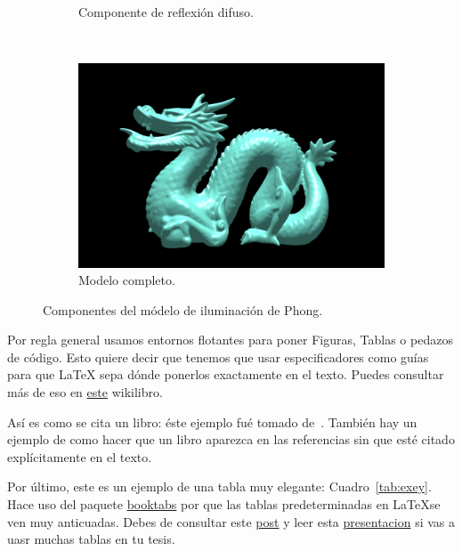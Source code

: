 \begin{figure}[htp]
\begin{subfigure}[b]{0.45\textwidth}
   \caption{Componente de reflexión difuso.}
   \label{fig:2c}
 \end{subfigure}
~
 \begin{subfigure}[b]{0.45\textwidth}
   \includegraphics[width=\textwidth]{img/cap02/completo}
   \caption{Modelo completo.}
   \label{fig:2d}
 \end{subfigure}
 \caption[Módelo de iluminación de Phong]{Componentes del módelo de iluminación de Phong.}
 \label{fig:two}
\end{figure}

Por regla general usamos entornos flotantes para poner Figuras, Tablas o pedazos de código.
Esto quiere decir que tenemos que usar especificadores como guías para que \LaTeX{} sepa dónde ponerlos exactamente en el texto.
Puedes consultar más de eso en \href{https://en.wikibooks.org/wiki/LaTeX/Floats,_Figures_and_Captions}{este} wikilibro.

Así es como se cita un libro: éste ejemplo fué tomado de~\cite{Gonzalez:ImagenesDigitales}.
También hay un ejemplo de como hacer que un libro aparezca en las referencias sin que esté citado explícitamente en el texto.

Por último, este es un ejemplo de una tabla muy elegante: Cuadro~\ref{tab:exey}.
Hace uso del paquete \href{https://ctan.org/pkg/booktabs}{booktabs} por que las tablas predeterminadas en \LaTeX se ven muy anticuadas.
Debes de consultar este \href{https://jdhao.github.io/2019/08/27/latex_table_with_booktabs/}{post} y leer esta \href{https://people.inf.ethz.ch/markusp/teaching/guides/guide-tables.pdf}{presentacion} si vas a uasr muchas tablas en tu tesis.

